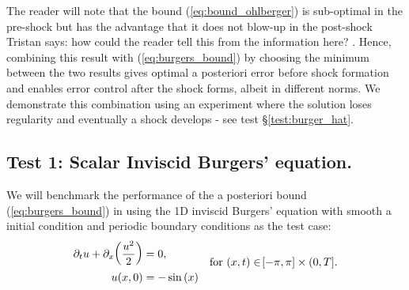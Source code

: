 \documentclass[final]{amsart}
\newcommand{\tristan}[1]{{\color{purple} Tristan says:  #1 }}
\numberwithin{equation}{section}
\begin{document}
\begin{Rem}
  The reader will note that the bound (\ref{eq:bound_ohlberger}) is
  sub-optimal in the pre-shock but has the advantage that it does not
  blow-up in the post-shock \tristan{how could the reader tell this
    from the information here?}.  Hence, combining this result with
  (\ref{eq:burgers_bound}) by choosing the minimum between the two
  results gives optimal a posteriori error before shock formation and
  enables error control after the shock forms, albeit in different
  norms. We demonstrate this combination using an experiment where the
  solution loses regularity and eventually a shock develops - see test
  \S \ref{test:burger_hat}.
\end{Rem}

\subsection{Test 1: Scalar Inviscid Burgers' equation. }
We will benchmark the performance of the a posteriori bound
(\ref{eq:burgers_bound}) in using the 1D inviscid Burgers' equation
with smooth a initial condition and periodic boundary conditions as
the test case:
\begin{equation}\label{eq_burgers}
\begin{aligned}
\partial_t u +\partial_x\!\left({\frac{u^2}{2}}\right)&=0,\\
u\!\left({x,0}\right)&=-\operatorname{sin}\left(x\right)
\end{aligned}\quad \text{for }\!\left({x,t}\right) \in \!\left[{-\pi,\pi}\right]\times(0,T].
\end{equation}
\end{document}
